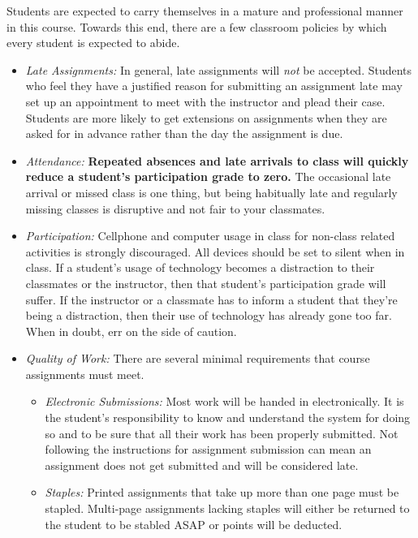 \documentclass[10pt]{article}
\begin{document}
Students are expected to carry themselves in a mature and professional manner in this course. Towards this end, there are a few classroom policies by which every student is expected to abide.
\begin{itemize}

\item \textit{Late Assignments: } In general, late assignments will \textit{not} be accepted.  Students who feel they have a justified reason for submitting an assignment late may set up an appointment to meet with the instructor and plead their case.  Students are more likely to get extensions on assignments when they are asked for in advance rather than the day the assignment is due.

\item \textit{Attendance: } \textbf{Repeated absences and late arrivals to class will quickly reduce a student's participation grade to zero.}  The occasional late arrival or missed class is one thing, but being habitually late and regularly missing classes is disruptive and not fair to your classmates.

\item \textit{Participation: }  Cellphone and computer usage in class for non-class related activities is strongly discouraged.  All devices should be set to silent when in class.  If a student's usage of technology becomes a distraction to their classmates or the instructor, then that student's participation grade will suffer.  If the instructor or a classmate has to inform a student that they're being a distraction, then their use of technology has already gone too far.  When in doubt, err on the side of caution.

\item \textit{Quality of Work:} There are several minimal requirements that course assignments must meet.
\begin{itemize}
\item \textit{Electronic Submissions:}  Most work will be handed in electronically.  It is the student's responsibility to know and understand the system for doing so and to be sure that all their work has been properly submitted. Not following the instructions for assignment submission can mean an assignment does not get submitted and will be considered late.

\item \textit{Staples:} Printed assignments that take up more than one page must be stapled.  Multi-page  assignments lacking staples will either be returned to the student to be stabled ASAP or points will be deducted.


\end{itemize}
\end{itemize}
\end{document}
